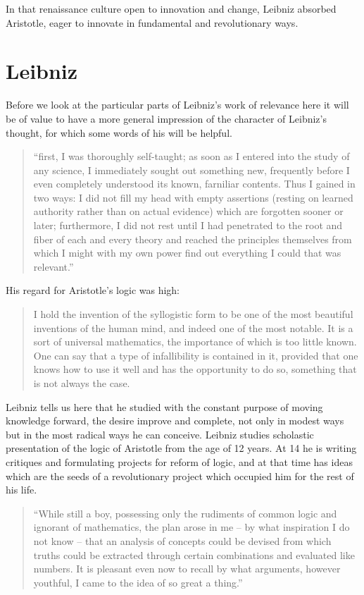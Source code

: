 In that renaissance culture open to innovation and change, Leibniz absorbed Aristotle, eager to
innovate in fundamental and revolutionary ways.

\section{Leibniz}

Before we look at the particular parts of Leibniz's work of relevance here it will
be of value to have a more general impression of the character of Leibniz's thought,
for which some words of his will be helpful.

\begin{quotation}
``first, I was thoroughly self-taught; as soon as I entered into the study of any science,
I immediately sought out something new, frequently before I even completely understood its known, farniliar contents.
Thus I gained in two ways: I did not fill my head with empty assertions (resting on learned authority rather than on actual evidence) which are forgotten sooner or later; furthermore, I did not rest until I had penetrated to the root and fiber of each and every theory and reached the principles themselves from which I might with my own power find out everything I could that was relevant.''
\end{quotation}

His regard for Aristotle's logic was high:
\begin{quotation}
I hold the invention of the syllogistic form to be one of the most beautiful
inventions of the human mind, and indeed one of the most notable. It is a
sort of universal mathematics, the importance of which is too little
known. One can say that a type of infallibility is contained in it, provided
that one knows how to use it well and has the opportunity to do so,
something that is not always the case.
\end{quotation}

Leibniz tells us here that he studied with the constant purpose of moving knowledge forward, the desire
improve and complete, not only in modest ways but in the most radical ways he can conceive.
Leibniz studies scholastic presentation of the logic of Aristotle from the age of 12 years.
At 14 he is writing critiques and formulating projects for reform of logic, and at that
time has ideas which are the seeds of a revolutionary project which occupied him for the rest of his life.

\begin{quotation}
``While still a boy, possessing only the
rudiments of common logic and ignorant of mathematics, the plan arose in me -- by what inspiration I do
not know -- that an analysis of concepts could be devised from which truths could be extracted through
certain combinations and evaluated like numbers. It is pleasant even now to recall by what arguments,
however youthful, I came to the idea of so great a thing.''
\end{quotation}


